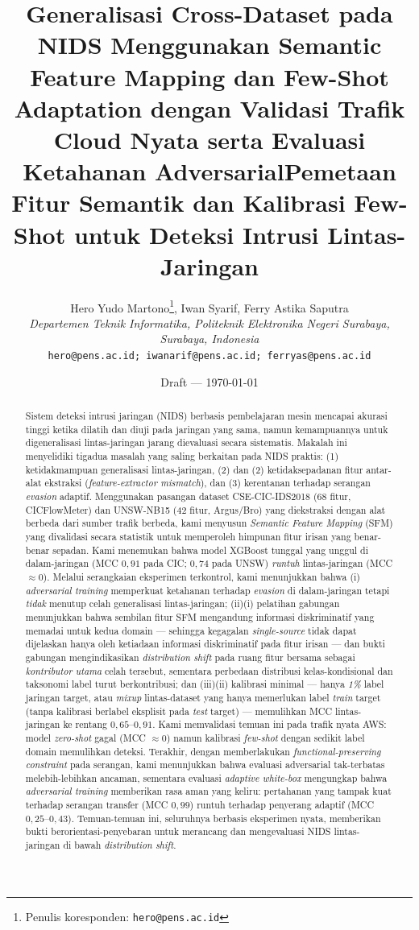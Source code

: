 \documentclass[11pt,a4paper]{article}
\title{\textbf{Generalisasi Cross-Dataset pada NIDS Menggunakan Semantic
  Feature Mapping dan Few-Shot Adaptation dengan Validasi Trafik Cloud Nyata
  serta Evaluasi Ketahanan Adversarial}}
\title{\textbf{Pemetaan Fitur Semantik dan Kalibrasi Few-Shot untuk Deteksi
  Intrusi Lintas-Jaringan}}
\author{Hero Yudo Martono\thanks{Penulis koresponden: \texttt{hero@pens.ac.id}},
\quad Iwan Syarif, \quad Ferry Astika Saputra \\[0.3em]
\textit{Departemen Teknik Informatika, Politeknik Elektronika Negeri Surabaya,
Surabaya, Indonesia} \\
\texttt{hero@pens.ac.id; iwanarif@pens.ac.id; ferryas@pens.ac.id}}
\date{Draft --- \today}
\begin{document}
\maketitle

\begin{abstract}
Sistem deteksi intrusi jaringan (NIDS) berbasis pembelajaran mesin mencapai
akurasi tinggi ketika dilatih dan diuji pada jaringan yang sama, namun
kemampuannya untuk digeneralisasi lintas-jaringan jarang dievaluasi secara sistematis.
Makalah ini menyelidiki \ifadversarial tiga\else dua\fi{} masalah yang saling berkaitan pada NIDS praktis:
(1) ketidakmampuan generalisasi lintas-jaringan\ifadversarial, (2)\else{} dan (2)\fi{} ketidaksepadanan fitur
antar-alat ekstraksi (\emph{feature-extractor mismatch})\ifadversarial, dan (3) kerentanan
terhadap serangan \emph{evasion} adaptif\fi. Menggunakan pasangan dataset
CSE-CIC-IDS2018 (68 fitur, CICFlowMeter) dan UNSW-NB15 (42 fitur, Argus/Bro)
yang diekstraksi dengan alat berbeda dari sumber trafik berbeda, kami menyusun
\emph{Semantic Feature Mapping} (SFM) yang divalidasi secara statistik untuk
memperoleh himpunan fitur irisan yang benar-benar sepadan. Kami menemukan bahwa
model XGBoost tunggal yang unggul di dalam-jaringan (MCC $0{,}91$ pada CIC;
$0{,}74$ pada UNSW) \emph{runtuh} lintas-jaringan (MCC $\approx 0$). Melalui
serangkaian eksperimen terkontrol, kami menunjukkan bahwa
\ifadversarial (i) \emph{adversarial
training} memperkuat ketahanan terhadap \emph{evasion} di dalam-jaringan tetapi
\emph{tidak} menutup celah generalisasi lintas-jaringan; (ii)\else (i)\fi{} pelatihan
gabungan menunjukkan bahwa sembilan fitur SFM mengandung informasi diskriminatif yang
memadai untuk kedua domain --- sehingga kegagalan \emph{single-source} tidak dapat
dijelaskan hanya oleh ketiadaan informasi diskriminatif pada fitur irisan --- dan
bukti gabungan mengindikasikan \emph{distribution shift} pada ruang fitur bersama
sebagai \emph{kontributor utama} celah tersebut, sementara perbedaan distribusi
kelas-kondisional dan taksonomi label turut berkontribusi; dan
\ifadversarial (iii)\else (ii)\fi{} kalibrasi minimal --- hanya \emph{1\%} label jaringan
target, atau \emph{mixup} lintas-dataset yang hanya memerlukan label \emph{train}
target (tanpa kalibrasi berlabel eksplisit pada \emph{test} target) ---
memulihkan MCC lintas-jaringan ke rentang $0{,}65$--$0{,}91$. Kami memvalidasi
temuan ini pada trafik nyata AWS: model \emph{zero-shot} gagal (MCC $\approx 0$)
namun kalibrasi \emph{few-shot} dengan sedikit label domain memulihkan deteksi.
\ifadversarial Terakhir, dengan
memberlakukan \emph{functional-preserving constraint} pada serangan, kami
menunjukkan bahwa evaluasi adversarial tak-terbatas melebih-lebihkan ancaman,
sementara evaluasi \emph{adaptive white-box} mengungkap bahwa \emph{adversarial
training} memberikan rasa aman yang keliru: pertahanan yang tampak kuat terhadap
serangan transfer (MCC $0{,}99$) runtuh terhadap penyerang adaptif
(MCC $0{,}25$--$0{,}43$). \fi Temuan-temuan ini, seluruhnya berbasis eksperimen
nyata, memberikan bukti berorientasi-penyebaran untuk merancang
dan mengevaluasi NIDS lintas-jaringan di bawah \emph{distribution shift}.


\end{abstract}
\end{document}

